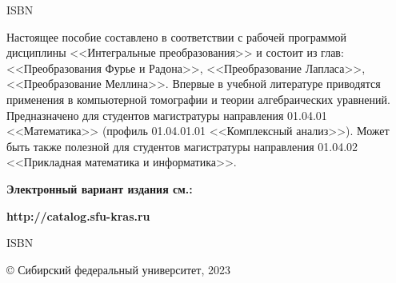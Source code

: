 ISBN 

\bigskip


{\normalsize
Настоящее пособие составлено в соответствии с рабочей программой дисциплины <<Интегральные преобразования>> и состоит из глав: <<Преобразования Фурье и Радона>>, <<Преобразование Лапласа>>, <<Преобразование Меллина>>. Впервые в учебной литературе приводятся применения в компьютерной томографии и теории алгебраических уравнений.
Предназначено для студентов магистратуры направления  01.04.01 <<Математика>> (профиль 01.04.01.01 <<Комплексный анализ>>). Может быть также полезной для студентов магистратуры направления  01.04.02 <<Прикладная математика и информатика>>.
}


\vfill

\textbf{Электронный вариант издания см.:} 

\textbf{http://catalog.sfu-kras.ru}

\vfill
ISBN 

\hfill \copyright \; Сибирский федеральный университет, 2023


\clearpage

